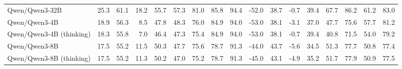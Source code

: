 \documentclass{article}
\begin{document}
\begin{table}[htbp]
\begin{threeparttable}
\begin{adjustbox}{max width=\textwidth}
\begin{tabular}{lrrrrrrrrrrrrrrrr}
Qwen/Qwen3-32B & \cellcolor[HTML]{BDDCEB}25.3 & \cellcolor[HTML]{B8D9E9}61.1 & \cellcolor[HTML]{EAF3F8}18.2 & \cellcolor[HTML]{DDEDF4}55.7 & \cellcolor[HTML]{C5E0ED}57.3 & \cellcolor[HTML]{BBDBEA}81.0 & \cellcolor[HTML]{9AC9E0}85.8 & \cellcolor[HTML]{98C8E0}94.4 & \cellcolor[HTML]{F7BEA5}-52.0 & \cellcolor[HTML]{F7C1A9}38.7 & \cellcolor[HTML]{D6E9F2}-0.7 & \cellcolor[HTML]{D4E8F2}39.4 & \cellcolor[HTML]{C4E0ED}67.7 & \cellcolor[HTML]{B5D7E8}86.2 & \cellcolor[HTML]{BDDCEB}61.2 & \cellcolor[HTML]{AFD4E6}83.0 \\
Qwen/Qwen3-4B & \cellcolor[HTML]{EAF4F8}18.9 & \cellcolor[HTML]{E1EFF6}56.3 & \cellcolor[HTML]{FCE8DF}8.5 & \cellcolor[HTML]{FDF2ED}47.8 & \cellcolor[HTML]{E9F3F8}48.3 & \cellcolor[HTML]{DCECF4}76.0 & \cellcolor[HTML]{9DCBE1}84.9 & \cellcolor[HTML]{9AC9E0}94.0 & \cellcolor[HTML]{F6B89C}-53.0 & \cellcolor[HTML]{F6BA9F}38.1 & \cellcolor[HTML]{FBE2D7}-3.1 & \cellcolor[HTML]{FBE4DA}37.0 & \cellcolor[HTML]{F3F8FB}47.7 & \cellcolor[HTML]{DBECF4}75.6 & \cellcolor[HTML]{C5E0ED}57.7 & \cellcolor[HTML]{B5D7E8}81.2 \\
Qwen/Qwen3-4B (thinking) & \cellcolor[HTML]{EEF6F9}18.3 & \cellcolor[HTML]{E5F1F7}55.8 & \cellcolor[HTML]{FBE1D6}7.0 & \cellcolor[HTML]{FCEBE4}46.4 & \cellcolor[HTML]{EDF5F9}47.3 & \cellcolor[HTML]{E0EEF5}75.4 & \cellcolor[HTML]{9DCBE1}84.9 & \cellcolor[HTML]{9AC9E0}94.0 & \cellcolor[HTML]{F6B89C}-53.0 & \cellcolor[HTML]{F6BA9F}38.1 & \cellcolor[HTML]{D6E9F2}-0.7 & \cellcolor[HTML]{D4E8F2}39.4 & \cellcolor[HTML]{FEFBF9}40.8 & \cellcolor[HTML]{EBF4F8}71.5 & \cellcolor[HTML]{CEE5F0}54.0 & \cellcolor[HTML]{BCDBEA}79.2 \\
Qwen/Qwen3-8B & \cellcolor[HTML]{F4F9FB}17.5 & \cellcolor[HTML]{EBF4F8}55.2 & \cellcolor[HTML]{FDF4F0}11.5 & \cellcolor[HTML]{FEFEFE}50.3 & \cellcolor[HTML]{ECF4F9}47.7 & \cellcolor[HTML]{DEEDF5}75.6 & \cellcolor[HTML]{B2D6E7}78.7 & \cellcolor[HTML]{ABD2E5}91.3 & \cellcolor[HTML]{FDF2ED}-44.0 & \cellcolor[HTML]{FEF6F3}43.7 & \cellcolor[HTML]{F4A582}-5.6 & \cellcolor[HTML]{F4A582}34.5 & \cellcolor[HTML]{EBF4F8}51.3 & \cellcolor[HTML]{D4E8F2}77.7 & \cellcolor[HTML]{D6E9F2}50.8 & \cellcolor[HTML]{C2DEEC}77.4 \\
Qwen/Qwen3-8B (thinking) & \cellcolor[HTML]{F4F9FB}17.5 & \cellcolor[HTML]{EBF4F8}55.2 & \cellcolor[HTML]{FDF3EF}11.3 & \cellcolor[HTML]{FEFEFE}50.2 & \cellcolor[HTML]{EEF6FA}47.0 & \cellcolor[HTML]{E1EFF6}75.2 & \cellcolor[HTML]{B2D6E7}78.7 & \cellcolor[HTML]{ABD2E5}91.3 & \cellcolor[HTML]{FCEBE4}-45.0 & \cellcolor[HTML]{FDF0EA}43.1 & \cellcolor[HTML]{F6B599}-4.9 & \cellcolor[HTML]{F6B69A}35.2 & \cellcolor[HTML]{EAF3F8}51.7 & \cellcolor[HTML]{D3E7F1}77.9 & \cellcolor[HTML]{D5E9F2}50.9 & \cellcolor[HTML]{C1DEEC}77.5 \\

\end{tabular}
\end{adjustbox}
\end{threeparttable}
\end{table}
\end{document}
